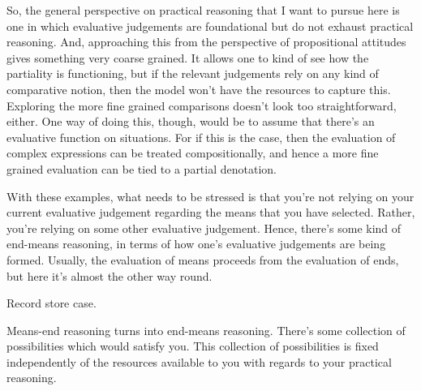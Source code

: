 \documentclass[10pt]{article}
\begin{document}
So, the general perspective on practical reasoning that I want to pursue here is one in which evaluative judgements are foundational but do not exhaust practical reasoning.
And, approaching this from the perspective of propositional attitudes gives something very coarse grained.
It allows one to kind of see how the partiality is functioning, but if the relevant judgements rely on any kind of comparative notion, then the model won't have the resources to capture this.
Exploring the more fine grained comparisons doesn't look too straightforward, either.
One way of doing this, though, would be to assume that there's an evaluative function on situations.
For if this is the case, then the evaluation of complex expressions can be treated compositionally, and hence a more fine grained evaluation can be tied to a partial denotation.

With these examples, what needs to be stressed is that you're not relying on your current evaluative judgement regarding the means that you have selected.
Rather, you're relying on some other evaluative judgement.
Hence, there's some kind of end-means reasoning, in terms of how one's evaluative judgements are being formed.
Usually, the evaluation of means proceeds from the evaluation of ends, but here it's almost the other way round.





\newpage


\newpage



Record store case.

Means-end reasoning turns into end-means reasoning.
There's some collection of possibilities which would satisfy you.
This collection of possibilities is fixed independently of the resources available to you with regards to your practical reasoning.
\end{document}
